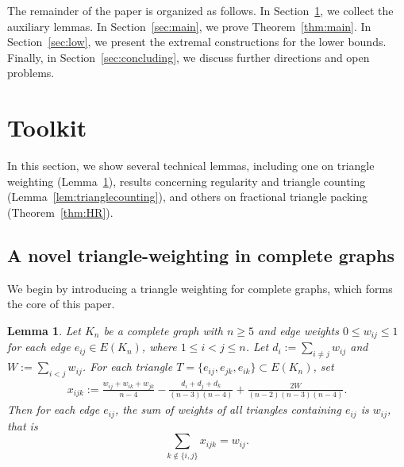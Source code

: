 \documentclass[11pt,reqno]{amsart}
\newtheorem{lemma}[theorem]{Lemma}
\theoremstyle{definition}
\theoremstyle{remark}
\renewcommand\leq{\leqslant}
\renewcommand\geq{\geqslant}
\begin{document}
The remainder of the paper is organized as follows. In Section~\ref{sec:toolkit}, we collect the auxiliary lemmas. In Section~\ref{sec:main}, we prove Theorem~\ref{thm:main}. In Section~\ref{sec:low}, we present the extremal constructions for the lower bounds. Finally, in Section~\ref{sec:concluding}, we discuss further directions and open problems.

\section{Toolkit}\label{sec:toolkit}

In this section, we show several technical lemmas, including one on triangle weighting (Lemma~\ref{lem:triangleweightkn}), results concerning regularity and triangle counting (Lemma~\ref{lem:trianglecounting}), and others on fractional triangle packing (Theorem~\ref{thm:HR}).


\subsection{A novel triangle-weighting in complete graphs}
We begin by introducing a triangle weighting for complete graphs, which forms the core of this paper. 

\begin{lemma}\label{lem:triangleweightkn}
Let $K_n$ be a complete graph with $n\geq 5$ and  edge weights $0\leq w_{ij}\leq1$ for each edge $e_{ij}\in E(K_n)$, where $1\leq i<j\leq n$. Let
$d_i:=\sum_{i\neq j}w_{ij}$ and $ W:=\sum_{i<j} w_{ij}$. For each triangle $T=\{e_{ij},e_{jk},e_{ik}\}\subset E(K_n)$, set
\begin{align}\label{eq:xijkl}
x_{ijk}:= \frac{w_{ij} + w_{ik} + w_{jk}}{n-4} - \frac{d_i + d_j + d_k}{(n-3)(n-4)} + \frac{2W}{(n-2)(n-3)(n-4)}.    
\end{align}
Then for each edge $e_{ij}$, the sum of weights of all triangles containing $e_{ij}$ is $w_{ij}$, that is
$$\sum_{k\notin \{i,j\}} x_{ijk}=w_{ij}.$$
\end{lemma}
\end{document}
